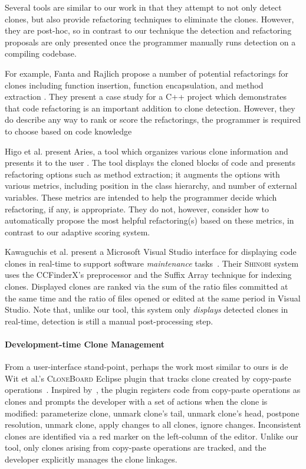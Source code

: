 \documentclass[nocopyrightspace,10pt]{sigplanconf}
\newcommand{\todo}[1]{{\bfseries [[#1]]}}
\renewcommand{\todo}[1]{\relax}
\begin{document}
Several tools are similar to our work in that they attempt to not only
detect clones, but also provide refactoring techniques to eliminate the clones.  However,
they are post-hoc, so in contrast to our technique
 the detection and refactoring proposals are only presented once the 
programmer manually runs detection on a compiling codebase.

For example, Fanta and Rajlich propose a number of
potential refactorings for clones including function insertion, function encapsulation,
and method extraction \cite{Fanta1999}.  They 
present a case study for a C++ project which demonstrates that code refactoring is an important 
addition to clone detection. However, they do describe any way to rank or score the refactorings,
the programmer is required to choose based on code knowledge

Higo et al. present Aries, a tool which organizes various clone
information and presents it to the user \cite{Higo2008}.  The tool displays the
cloned blocks of code and presents refactoring options such as method
extraction; it augments the options with various metrics, including position in
the class hierarchy, and number of external variables. These metrics
are intended to help the programmer decide which refactoring, if any,
is appropriate. They do not, however, consider how to automatically 
propose the most helpful refactoring(s) based on these metrics, in contrast 
to our adaptive scoring system.

Kawaguchis et al. present a  
Microsoft Visual Studio interface for
displaying code clones in real-time to support software
\emph{maintenance} tasks~\cite{Kawaguchi2009,Yamashina2008}. Their
\textsc{Shinobi} system uses the CCFinderX's preprocessor and the Suffix Array
technique for indexing clones. Displayed clones are ranked via the sum
of the ratio files committed at the same time and the ratio of files
opened or edited at the same period in Visual Studio. Note that, unlike our tool,
 this system only \emph{displays} detected clones in real-time, detection is still
 a manual post-processing step.

\paragraph{Development-time Clone Management}

From a user-interface stand-point, perhaps the work most similar to
ours is de Wit et al.'s \textsc{CloneBoard} Eclipse plugin that tracks
clone created by copy-paste operations~\cite{deWit2009}. Inspired
by~\cite{Mann2006}, the plugin registers code from copy-paste
operations as clones and prompts the developer with a set of actions
when the clone is modified: parameterize clone, unmark clone's tail,
unmark clone's head, postpone resolution, unmark clone, apply changes
to all clones, ignore changes. Inconsistent clones are identified via
a red marker on the left-column of the editor. Unlike our tool, only
clones arising from copy-paste operations are tracked, and the
developer explicitly manages the clone linkages.
\end{document}
